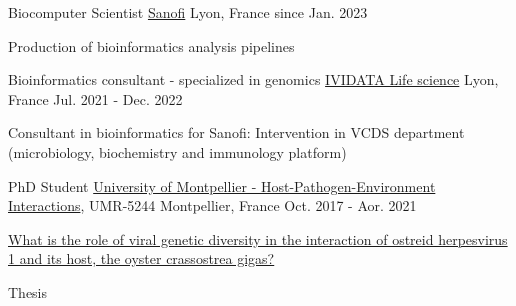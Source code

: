 

\begin{cventries}

 \cventry
    {Biocomputer Scientist} %
    {\href{https://www.sanofi.com/en}{Sanofi}} %
    {Lyon, France} %
    {since Jan. 2023} %
    {
      \begin{cvitems} %
        \item {Production of bioinformatics analysis pipelines}
      \end{cvitems}
    }

 \cventry
    {Bioinformatics consultant - specialized in genomics} %
    {\href{https://www.ividata.com/}{IVIDATA Life science}} %
    {Lyon, France} %
    {Jul. 2021 - Dec. 2022} %
    {
      \begin{cvitems} %
        \item {Consultant in bioinformatics for Sanofi: Intervention in VCDS department (microbiology, biochemistry and immunology platform)}
      \end{cvitems}
    }
    
  \cventry
    {PhD Student}%
    {\href{http://ihpe.univ-perp.fr/}{University of Montpellier - Host-Pathogen-Environment Interactions}, UMR-5244} %
    {Montpellier, France} %
    {Oct. 2017 - Aor. 2021} %
    {
      \begin{cvitems} %
        \item {\href{https://www.theses.fr/2021MONTG012}{What is the role of viral genetic diversity in the interaction of ostreid herpesvirus 1 and its host, the oyster crassostrea gigas?}}
        \item {Thesis}
      \end{cvitems}
    }
    

\end{cventries}
